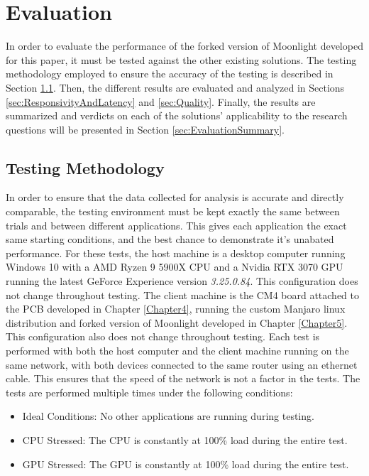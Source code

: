 \chapter{Evaluation}

\label{Chapter6}

In order to evaluate the performance of the forked version of Moonlight developed for this paper, it must be tested against the other existing solutions.
The testing methodology employed to ensure the accuracy of the testing is described in Section \ref{sec:TestingMethodology}.
Then, the different results are evaluated and analyzed in Sections \ref{sec:ResponsivityAndLatency} and \ref{sec:Quality}.
Finally, the results are summarized and verdicts on each of the solutions' applicability to the research questions will be presented in Section \ref{sec:EvaluationSummary}.


\section{Testing Methodology}\label{sec:TestingMethodology}

In order to ensure that the data collected for analysis is accurate and directly comparable, the testing environment must be kept exactly the same between trials and between different applications.
This gives each application the exact same starting conditions, and the best chance to demonstrate it's unabated performance.
For these tests, the host machine is a desktop computer running Windows 10 with a AMD Ryzen 9 5900X CPU and a Nvidia RTX 3070 GPU running the latest GeForce Experience version \emph{3.25.0.84}.
This configuration does not change throughout testing.
The client machine is the CM4 board attached to the PCB developed in Chapter \ref{Chapter4}, running the custom Manjaro linux distribution and forked version of Moonlight developed in Chapter \ref{Chapter5}.
This configuration also does not change throughout testing.
Each test is performed with both the host computer and the client machine running on the same network, with both devices connected to the same router using an ethernet cable.
This ensures that the speed of the network is not a factor in the tests.
The tests are performed multiple times under the following conditions:

\begin{itemize}
  \item Ideal Conditions: No other applications are running during testing.
  \item CPU Stressed: The CPU is constantly at 100\% load during the entire test.
  \item GPU Stressed: The GPU is constantly at 100\% load during the entire test.
\end{itemize}

